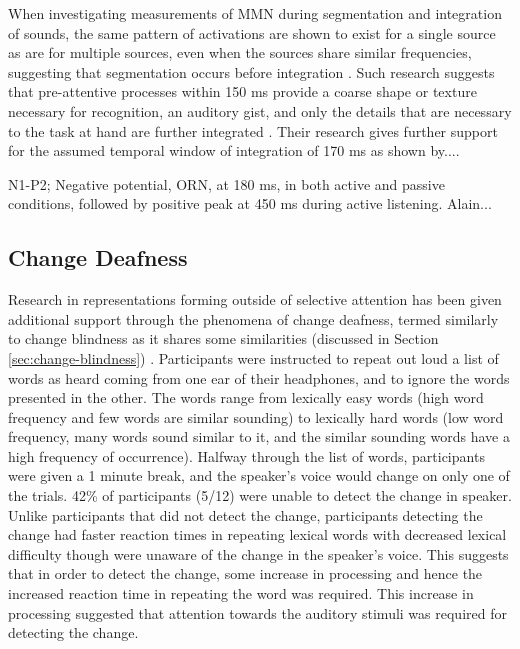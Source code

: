 When investigating measurements of MMN during segmentation and integration of sounds, the same pattern of activations are shown to exist for a single source as are for multiple sources, even when the sources share similar frequencies, suggesting that segmentation occurs before integration \cite{Sussman2005}. Such research suggests that pre-attentive processes within 150 ms provide a coarse shape or texture necessary for recognition, an auditory gist, and only the details that are necessary to the task at hand are further integrated \cite{Harding2007}.  Their research gives further support for the assumed temporal window of integration of 170 ms as shown by...\cite{}.

N1-P2; Negative potential, ORN, at 180 ms, in both active and passive conditions, followed by positive peak at 450 ms during active listening.  Alain... \cite{Alain2001}

\subsection{Change Deafness}

Research in representations forming outside of selective attention has been given additional support through the phenomena of change deafness, termed similarly to change blindness as it shares some similarities (discussed in Section \ref{sec:change-blindness}) \cite{Vitevitch2000}.  Participants were instructed to repeat out loud a list of words as heard coming from one ear of their headphones, and to ignore the words presented in the other.  The words range from lexically easy words (high word frequency and few words are similar sounding) to lexically hard words (low word frequency, many words sound similar to it, and the similar sounding words have a high frequency of occurrence).  Halfway through the list of words, participants were given a 1 minute break, and the speaker's voice would change on only one of the trials.  42\% of participants (5/12) were unable to detect the change in speaker.  Unlike participants that did not detect the change, participants detecting the change had faster reaction times in repeating lexical words with decreased lexical difficulty though were unaware of the change in the speaker's voice.  This suggests that in order to detect the change, some increase in processing and hence the increased reaction time in repeating the word was required.  This increase in processing suggested that attention towards the auditory stimuli was required for detecting the change.

